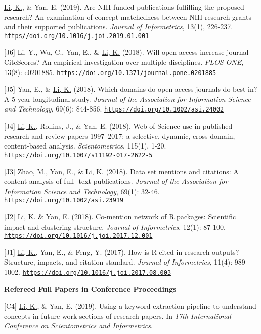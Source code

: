 \documentclass[margin, 10pt]{res} %
\begin{document}
\begin{resume}
[J7] \underline{Li, K.}, \& Yan, E. (2019). Are NIH-funded publications fulfilling the proposed research? An examination of concept-matchedness between NIH research grants and their supported publications. \textit{Journal of Informetrics}, 13(1), 226-237. \href{https//doi.org/10.1016/j.joi.2019.01.001}{\nolinkurl{https//doi.org/10.1016/j.joi.2019.01.001}}

[J6] Li, Y., Wu, C., Yan, E., \& \underline{Li, K.} (2018). Will open access increase journal CiteScores? An empirical investigation over multiple disciplines. \textit{PLOS ONE}, 13(8): e0201885. \href{https://doi.org/10.1371/journal.pone.0201885}{\nolinkurl{https://doi.org/10.1371/journal.pone.0201885}}

[J5] Yan, E., \& \underline{Li, K.} (2018). Which domains do open-access journals do best in? A 5-year longitudinal study. \textit{Journal of the Association for Information Science and Technology}, 69(6): 844-856. \href{https://doi.org/10.1002/asi.24002}{\nolinkurl{https://doi.org/10.1002/asi.24002}}

[J4] \underline{Li, K.}, Rollins, J., \& Yan, E. (2018). Web of Science use in published research and review papers 1997–2017: a selective, dynamic, cross-domain, content-based analysis. \textit{Scientometrics}, 115(1), 1-20. \href{https://doi.org/10.1007/s11192-017-2622-5}{\nolinkurl{https://doi.org/10.1007/s11192-017-2622-5}} 

[J3] Zhao, M., Yan, E., \& \underline{Li, K.} (2018). Data set mentions and citations: A content analysis of full- text publications. \textit{Journal of the Association for Information Science and Technology}, 69(1): 32-46. \href{https://doi.org/10.1002/asi.23919}{\nolinkurl{https://doi.org/10.1002/asi.23919}}

[J2] \underline{Li, K.} \& Yan, E. (2018). Co-mention network of R packages: Scientific impact and clustering structure. \textit{Journal of Informetrics}, 12(1): 87-100. \href{https://doi.org/10.1016/j.joi.2017.12.001}{\nolinkurl{https://doi.org/10.1016/j.joi.2017.12.001}}

[J1] \underline{Li, K.}, Yan, E., \& Feng, Y. (2017). How is R cited in research outputs? Structure, impacts, and citation standard. \textit{Journal of Informetrics}, 11(4): 989-1002. \href{https://doi.org/10.1016/j.joi.2017.08.003}{\nolinkurl{https://doi.org/10.1016/j.joi.2017.08.003}}

\textbf{Refereed Full Papers in Conference Proceedings}

[C4] \underline{Li, K.}, \& Yan, E. (2019). Using a keyword extraction pipeline to understand concepts in future work sections of research papers. In \textit{17th International Conference on Scientometrics and Informetrics}.


\end{resume}
\end{document}
